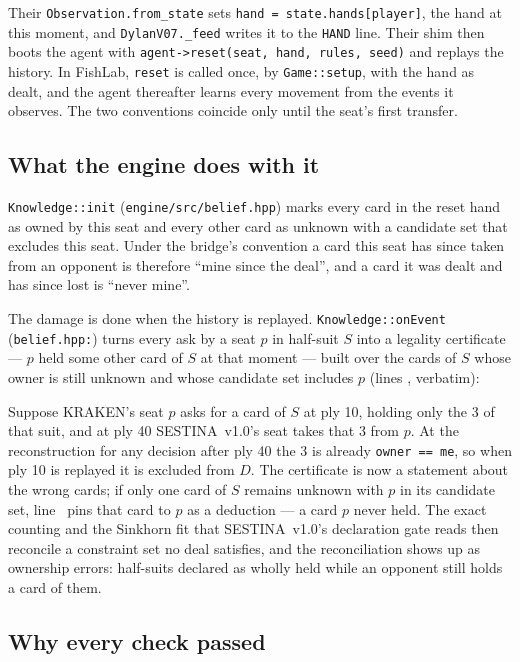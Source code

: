 \documentclass[11pt]{article}
\newcommand{\code}[1]{\texttt{#1}}
\newcommand{\sestina}{\mbox{SESTINA v1.0}}
\begin{document}
Their \code{Observation.from\_state} sets \code{hand = state.hands[player]}, the hand at this moment,
and \code{DylanV07.\_feed} writes it to the \code{HAND} line. Their shim then boots the agent with
\code{agent->reset(seat, hand, rules, seed)} and replays the history. In FishLab, \code{reset} is
called once, by \code{Game::setup}, with the hand as dealt, and the agent thereafter learns every
movement from the events it observes. The two conventions coincide only until the seat's first
transfer.

\subsection{What the engine does with it}

\code{Knowledge::init} (\code{engine/src/belief.hpp}) marks every card in the reset hand as owned by
this seat and every other card as unknown with a candidate set that excludes this seat. Under the
bridge's convention a card this seat has since taken from an opponent is therefore ``mine since the
deal'', and a card it was dealt and has since lost is ``never mine''.

The damage is done when the history is replayed. \code{Knowledge::onEvent}
(\code{belief.hpp:\kcBeliefCertLines}) turns every ask by a seat $p$ in half-suit $S$ into a legality
certificate --- $p$ held some other card of $S$ at that moment --- built over the cards of $S$ whose
owner is still unknown and whose candidate set includes $p$ (lines \kcBeliefCertLines{}, verbatim):

Suppose KRAKEN's seat $p$ asks for a card of $S$ at ply 10, holding only the 3 of that suit, and at ply
40 \sestina{}'s seat takes that 3 from $p$. At the reconstruction for any decision after ply 40 the 3
is already \code{owner == me}, so when ply 10 is replayed it is excluded from $D$. The certificate is
now a statement about the wrong cards; if only one card of $S$ remains unknown with $p$ in its
candidate set, line~\kcBeliefPinLine{} pins that card to $p$ as a deduction --- a card $p$ never
held. The exact counting and the Sinkhorn fit that \sestina{}'s declaration gate reads then reconcile a
constraint set no deal satisfies, and the reconciliation shows up as ownership errors: half-suits
declared as wholly held while an opponent still holds a card of them.

\subsection{Why every check passed}
\end{document}

